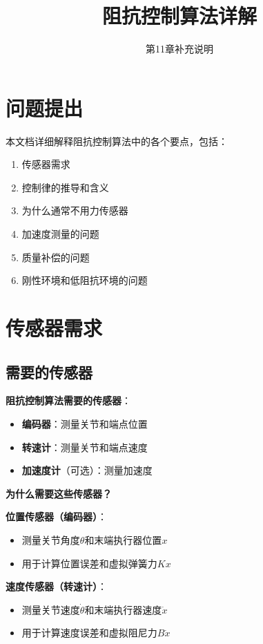 \documentclass[12pt,a4paper]{article}
\title{阻抗控制算法详解}
\author{第11章补充说明}
\date{}
\begin{document}
\maketitle

\section{问题提出}

本文档详细解释阻抗控制算法中的各个要点，包括：
\begin{enumerate}
\item 传感器需求
\item 控制律的推导和含义
\item 为什么通常不用力传感器
\item 加速度测量的问题
\item 质量补偿的问题
\item 刚性环境和低阻抗环境的问题
\end{enumerate}

\section{传感器需求}

\subsection{需要的传感器}

\textbf{阻抗控制算法需要的传感器}：
\begin{itemize}
\item \textbf{编码器}：测量关节和端点位置
\item \textbf{转速计}：测量关节和端点速度
\item \textbf{加速度计}（可选）：测量加速度
\end{itemize}

\textbf{为什么需要这些传感器？}

\textbf{位置传感器（编码器）}：
\begin{itemize}
\item 测量关节角度$\theta$和末端执行器位置$x$
\item 用于计算位置误差和虚拟弹簧力$Kx$
\end{itemize}

\textbf{速度传感器（转速计）}：
\begin{itemize}
\item 测量关节速度$\dot{\theta}$和末端执行器速度$\dot{x}$
\item 用于计算速度误差和虚拟阻尼力$B\dot{x}$
\end{itemize}
\end{document}
